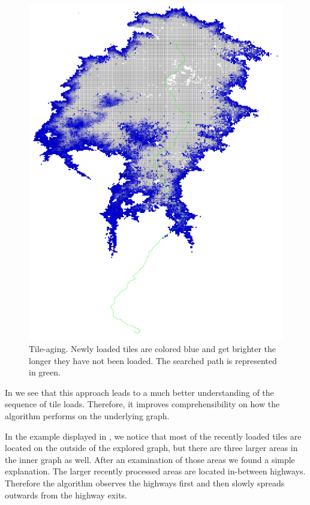 \documentclass
[
    paper = a4,
    pagesize,
    12 pt,
    oneside,                       %
    open = right,
    DIV = calc,
    BCOR = 0 mm,                   %
    bibtotoc
]
{scrbook}
\begin{document}
\begin{figure}
    \includegraphics[width=\textwidth]{Images/vis-aged-coloring.png}
\caption[]{Tile-aging. Newly loaded tiles are colored blue and get brighter the longer they have not been loaded. The searched path is represented in green.}
\label{fig:color_aged_tile}
\end{figure}

In  we see that this approach leads to a much better understanding of the sequence of tile loads.
Therefore, it improves comprehensibility on how the algorithm performs on the underlying graph.

In the example displayed in , we notice that most of the recently loaded tiles are located on the outside of the explored graph, but there are three larger areas in the inner graph as well.
After an examination of those areas we found a simple explanation.
The larger recently processed areas are located in-between highways.
Therefore the algorithm observes the highways first and then slowly spreads outwards from the highway exits.
\end{document}
